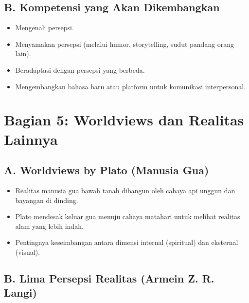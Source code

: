 \documentclass[
  letterpaper,
  DIV=11,
  numbers=noendperiod]{scrreprt}
\providecommand{\tightlist}{%
  \setlength{\itemsep}{0pt}\setlength{\parskip}{0pt}}
\begin{document}
\subsection{B. Kompetensi yang Akan
Dikembangkan}\label{b.-kompetensi-yang-akan-dikembangkan}

\begin{itemize}
\tightlist
\item
  Mengenali persepsi.
\item
  Menyamakan persepsi (melalui humor, storytelling, sudut pandang orang
  lain).
\item
  Beradaptasi dengan persepsi yang berbeda.
\item
  Mengembangkan bahasa baru atau platform untuk komunikasi
  interpersonal.
\end{itemize}

\section{Bagian 5: Worldviews dan Realitas
Lainnya}\label{bagian-5-worldviews-dan-realitas-lainnya}

\subsection{A. Worldviews by Plato (Manusia
Gua)}\label{a.-worldviews-by-plato-manusia-gua}

\begin{itemize}
\tightlist
\item
  Realitas manusia gua bawah tanah dibangun oleh cahaya api unggun dan
  bayangan di dinding.
\item
  Plato mendesak keluar gua menuju cahaya matahari untuk melihat
  realitas alam yang lebih indah.
\item
  Pentingnya keseimbangan antara dimensi internal (spiritual) dan
  eksternal (visual).
\end{itemize}

\subsection{B. Lima Persepsi Realitas (Armein Z. R.
Langi)}\label{b.-lima-persepsi-realitas-armein-z.-r.-langi}
\end{document}
